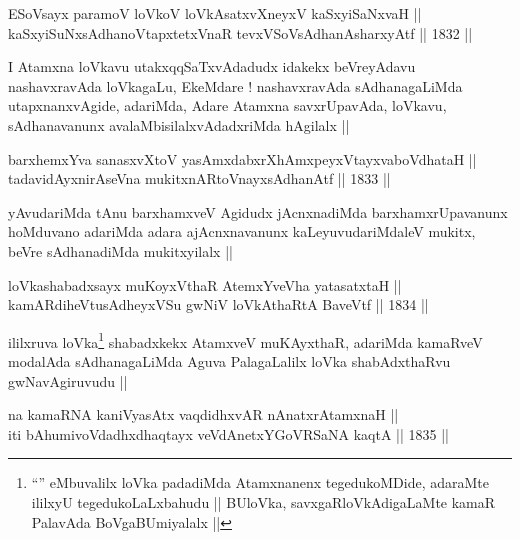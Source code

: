 
\begin{shl}
ESoV\s sayx paramoV loVkoV loVkAsatxvXneyxV kaSxyiSaNxvaH || \\
kaSxyiSuNxsAdhanoVtapxtetxVnaR tevxVSoV\s sAdhanAsharxyAtf ||  1832 ||  
\end{shl}

\begin{artha}
I Atamxna loVkavu utakxqqSaTxvAdadudx idakekx beVreyAdavu
nashavxravAda loVkagaLu, EkeMdare ! nashavxravAda sAdhanagaLiMda
utapxnanxvAgide, adariMda, Adare Atamxna savxrUpavAda, loVkavu,
sAdhanavanunx avalaMbisilalxvAdadxriMda hAgilalx ||
\end{artha}

\begin{shl}
barxhemxYva sanasxvXtoV yasAmxdabxrXhAmxpeyxVtayxvaboVdhataH || \\
tadavidAyxnirAseVna mukitxnARtoV\s nayxsAdhanAtf ||  1833 ||  
\end{shl}

\begin{artha}
yAvudariMda tAnu barxhamxveV Agidudx jAcnxnadiMda barxhamxrUpavanunx
hoMduvano adariMda adara ajAcnxnavanunx kaLeyuvudariMdaleV mukitx,
beVre sAdhanadiMda mukitxyilalx ||
\end{artha}


\begin{shl}
loVkashabadxsayx muKoyxV\s thaR AtemxYveVha yatasatxtaH || \\
kamARdiheVtusAdheyxVSu gwNiV loVkAthaRtA BaveVtf ||  1834 ||  
\end{shl}

\begin{artha}
ililxruva loVka\footnote[1]{``\stext'' eMbuvalilx loVka padadiMda
  Atamxnanenx tegedukoMDide, adaraMte ililxyU tegedukoLaLxbahudu ||
  BUloVka, savxgaRloVkAdigaLaMte kamaR PalavAda BoVgaBUmiyalalx ||} shabadxkekx AtamxveV muKAyxthaR,
adariMda kamaRveV modalAda sAdhanagaLiMda Aguva PalagaLalilx loVka
shabAdxthaRvu gwNavAgiruvudu ||
\end{artha}


\begin{shl}
na kamaRNA kaniVyasAtx vaqdidhxvAR nAnatxrAtamxnaH ||  \\
iti bAhumivoVdadhxdhaqtayx veVdAnetxYGoVRSaNA kaqtA ||  1835 ||  
\end{shl}


